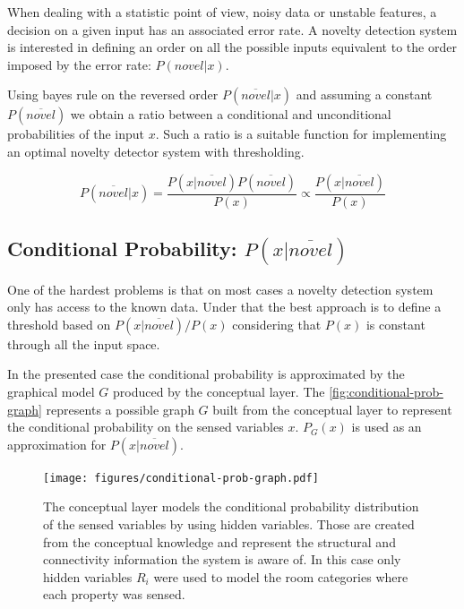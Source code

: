 \documentclass[runningheads,a4paper]{llncs}
\begin{document}
When dealing with a statistic point of view, noisy data or unstable features, a decision on a
given input has an associated error rate. A novelty detection system is interested in defining an
order on all the possible inputs equivalent to the order imposed by the error rate: $P(novel|x)$.

Using bayes rule on the reversed order $P(\overline{novel}|x)$ and assuming a constant $P(\overline{novel})$
we obtain a ratio between a conditional and unconditional probabilities of the input $x$.
Such a ratio is a suitable function for implementing an optimal novelty detector system with
thresholding.

\begin{equation}
\label{eq:novelty-threshold}
          P(\overline{novel}|x)
  =       \frac{P(x|\overline{novel}) P(\overline{novel})}{P(x)}
  \propto \frac{P(x|\overline{novel})}{P(x)}
\end{equation}

\subsection{Conditional Probability: $P(x|\overline{novel})$}
\label{sec:uniform-unconditional}

One of the hardest problems is that on most cases a novelty detection system only has access to 
the known data.
Under that the best approach is to define a threshold based on $P(x|\overline{novel})/P(x)$
considering that $P(x)$ is constant through all the input space.

In the presented case the conditional probability is approximated by the graphical model $G$
produced by the conceptual layer.
The \autoref{fig:conditional-prob-graph} represents a possible graph $G$ built from the conceptual
layer to represent the conditional probability on the sensed variables $x$.
$P_G(x)$ is used as an approximation for $P(x|\overline{novel})$.

\begin{figure}[h]
\centering
\texttt{[image: figures/conditional-prob-graph.pdf]}
\caption{\label{fig:conditional-prob-graph}The conceptual layer models the conditional
         probability distribution of the sensed variables by using hidden variables.
         Those are created from the conceptual knowledge and represent the structural
         and connectivity information the system is aware of.
         In this case only hidden variables $R_i$ were used to model the room categories
         where each property was sensed.}
\end{figure}
\end{document}
